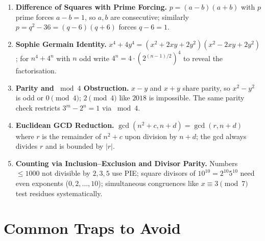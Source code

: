 \documentclass[11pt,a4paper]{article}
\begin{document}
\begin{enumerate}[leftmargin=2em, itemsep=4pt]
  \item \textbf{Difference of Squares with Prime Forcing.}
        $p=(a-b)(a+b)$ with $p$ prime forces $a-b=1$, so $a,b$ are consecutive; similarly $p=q^{2}-36=(q-6)(q+6)$ forces $q-6=1$. 
  \item \textbf{Sophie Germain Identity.}
        $x^{4}+4y^{4}=(x^{2}+2xy+2y^{2})(x^{2}-2xy+2y^{2})$; for $n^{4}+4^{n}$ with $n$ odd write $4^{n}=4\cdot(2^{(n-1)/2})^{4}$ to reveal the factorisation. 
  \item \textbf{Parity and $\bmod 4$ Obstruction.}
        $x-y$ and $x+y$ share parity, so $x^{2}-y^{2}$ is odd or $0\pmod4$; $2\pmod4$ like $2018$ is impossible. The same parity check restricts $3^{m}-2^{n}=1$ via $\bmod4$. 
  \item \textbf{Euclidean GCD Reduction.}
        $\gcd(n^{2}+c,n+d)=\gcd(r,n+d)$ where $r$ is the remainder of $n^{2}+c$ upon division by $n+d$; the gcd always divides $r$ and is bounded by $|r|$. 
  \item \textbf{Counting via Inclusion--Exclusion and Divisor Parity.}
        Numbers $\le1000$ not divisible by $2,3,5$ use PIE; square divisors of $10^{10}=2^{10}5^{10}$ need even exponents ($0,2,\dots,10$); simultaneous congruences like $x\equiv3\pmod7$ test residues systematically. 
\end{enumerate}

\section*{Common Traps to Avoid}
\end{document}
